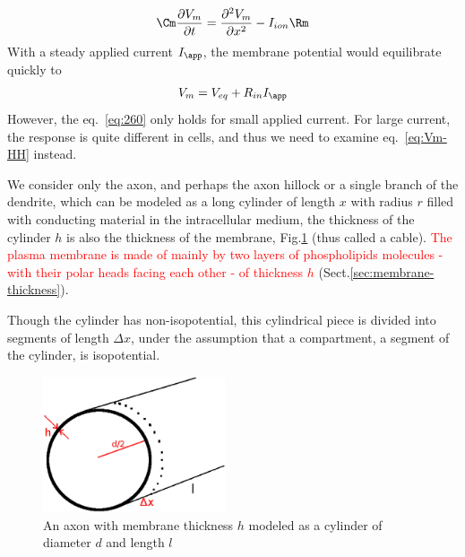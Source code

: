   \begin{eqnarray*}
    \Cm \frac{\partial V_m}{\partial t}  =
    \frac{\partial^2V_m}{\partial x^2} - I_{ion} \Rm
  \end{eqnarray*}
  With a steady applied current $I_\app$, the membrane potential would
  equilibrate quickly to
  \begin{equation}
    \label{eq:260}
    V_m = V_{eq} + R_{in} I_\app
  \end{equation}
  However, the eq.~\eqref{eq:260} only holds for small applied
  current. For large current, the response is quite different in
  cells, and thus we need to examine eq.~\eqref{eq:Vm-HH} instead.



We consider only the axon, and perhaps the axon hillock or a single branch of
the dendrite, which can be modeled as a long cylinder of length $x$ with
radius $r$ filled with conducting material in the intracellular medium, the
thickness of the cylinder $h$ is also the thickness of the membrane,
Fig.\ref{fig:membrane-cylinder} (thus called a cable).
\textcolor{red}{The plasma membrane is made of mainly by two layers of
phospholipids molecules - with their  polar heads facing each other - of
thickness $h$} (Sect.\ref{sec:membrane-thickness}).

Though the cylinder has non-isopotential, this cylindrical piece is divided into
segments of length $\Delta x$, under the assumption that a compartment, a
segment of the cylinder, is isopotential.

\begin{figure}[htb]
\centerline{\includegraphics[height=4cm]{./images/membrane-cylinder.eps}}
\caption{An axon with membrane thickness $h$ modeled as a
cylinder of diameter $d$ and length $l$}\label{fig:membrane-cylinder}
\end{figure} 

